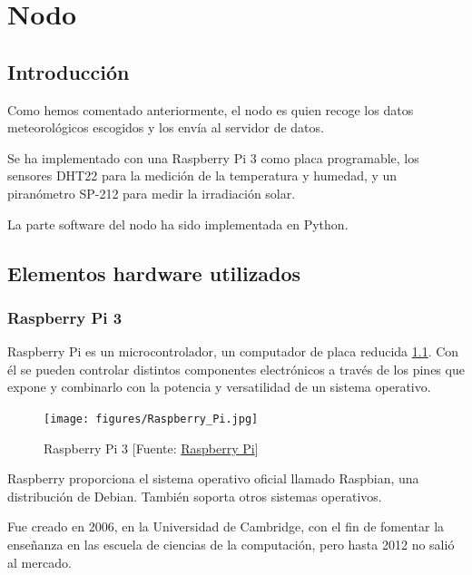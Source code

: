 \cleardoublepage

\chapter{Nodo}
\label{makereference2}

\section{Introducción}
\label{makereference2.1}
Como hemos comentado anteriormente, el nodo es quien recoge los datos meteorológicos escogidos y los envía al servidor de datos.

Se ha implementado con una Raspberry Pi 3 como placa programable, los sensores DHT22 para la medición de la temperatura y humedad, y un piranómetro SP-212 para medir la irradiación solar.

La parte software del nodo ha sido implementada en Python.

\section{Elementos hardware utilizados}
\label{makereference2.2}

\subsection{Raspberry Pi 3}
\label{makereference2.2.1}

Raspberry Pi es un microcontrolador, un computador de placa reducida \ref{rasp}. Con él se pueden controlar distintos componentes electrónicos a través de los pines que expone y combinarlo con la potencia y versatilidad de un sistema operativo.

\begin{figure}[htb]
	\begin{center}
		\texttt{[image: figures/Raspberry\_Pi.jpg]}
		\caption{Raspberry Pi 3 [Fuente: \href{https://www.raspberrypi.org}{Raspberry Pi}] \label{rasp}}
	\end{center}
\end{figure}

Raspberry proporciona el sistema operativo oficial llamado Raspbian, una distribución de Debian. También soporta otros sistemas operativos.
 
Fue creado en 2006, en la Universidad de Cambridge, con el fin de fomentar la enseñanza en las escuela de ciencias de la computación, pero hasta 2012 no salió al mercado.

